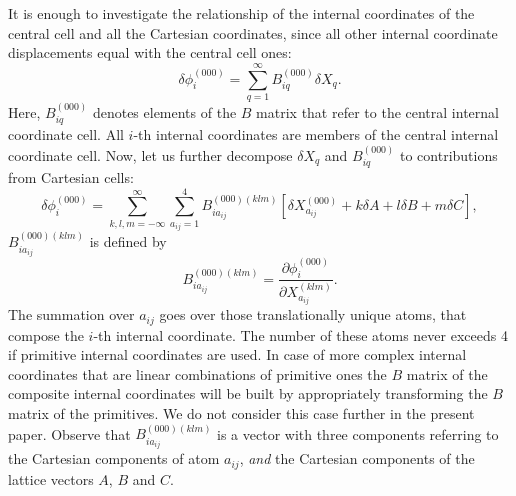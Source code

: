\documentclass[prl,aps,preprint,superbib,12pt]{revtex4}
\begin{document}
It is enough to investigate the relationship of the internal 
coordinates of the central cell and all the Cartesian coordinates,
since all other internal coordinate displacements equal with the 
central cell ones:
\begin{equation} \label{intdispl1}
\delta \phi^{(000)}_{i} = \sum_{q=1}^{\infty} B^{(000)}_{iq} \delta X_{q} .
\end{equation}
Here, $B^{(000)}_{iq}$ denotes elements of the $B$ matrix that refer to
the central internal coordinate cell. All $i$-th internal coordinates
are members of the central internal coordinate cell.
Now, let us further decompose $\delta X_{q}$ and $B^{(000)}_{iq}$ 
to contributions from Cartesian cells:
\begin{equation}
\delta \phi^{(000)}_{i} = \sum_{k,l,m=-\infty}^{\infty} 
\sum_{a_{ij}=1}^{4} 
B^{(000)(klm)}_{ia_{ij}} [ \delta X^{(000)}_{a_{ij}} + k \delta A + 
l \delta B + m \delta C ] ,
\end{equation}
$B^{(000)(klm)}_{ia_{ij}}$ is defined by
\begin{equation} 
B^{(000)(klm)}_{ia_{ij}} = \frac{\partial \phi^{(000)}_{i}}{\partial X^{(klm)}_{a_{ij}}} .
\end{equation} 
The summation over $a_{ij}$ goes over those translationally unique
atoms, that compose the $i$-th internal coordinate. The number of 
these atoms never exceeds 4 if primitive internal coordinates are used.
In case of more complex internal coordinates that are linear 
combinations of primitive ones the $B$ matrix of the composite 
internal coordinates will be built
by appropriately transforming the $B$ matrix of the primitives. 
We do not consider this case further in the 
present paper.
Observe that $B^{(000)(klm)}_{ia_{ij}}$ is a 
vector with three components referring to the Cartesian components
of atom $a_{ij}$, {\it and} the Cartesian components of the
lattice vectors $A$, $B$ and $C$.





\end{document}
